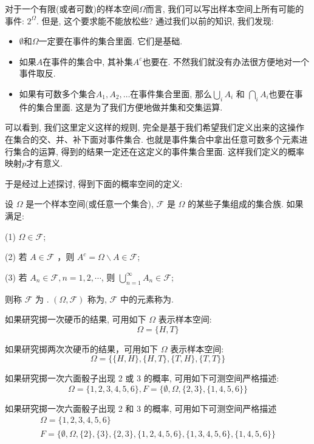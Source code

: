 \documentclass{ctexart}
\begin{document}
对于一个有限(或者可数)的样本空间$\Omega$而言, 我们可以写出样本空间上所有可能的事件: $2^\Omega$. 但是, 这个要求能不能放松些? 通过我们以前的知识, 我们发现: 
\begin{itemize}
    \item $\emptyset$和$\Omega$一定要在事件的集合里面. 它们是基础. 
    \item 如果$A$在事件的集合中, 其补集$A^c$也要在. 不然我们就没有办法很方便地对一个事件取反. 
    \item 如果有可数多个集合$A_1, A_2, \ldots$在事件集合里面, 那么$\bigcup_i A_i$ 和 $\bigcap_i A_i$也要在事件的集合里面. 这是为了我们方便地做并集和交集运算. 
\end{itemize} 

可以看到, 我们这里定义这样的规则, 完全是基于我们希望我们定义出来的这操作在集合的交、并、补下面对事件集合. 也就是事件集合中拿出任意可数多个元素进行集合的运算, 得到的结果一定还在这定义的事件集合里面. 这样我们定义的概率映射$p$才有意义. 

于是经过上述探讨, 得到下面的概率空间的定义: 

\begin{definition}
    设 $\Omega$ 是一个样本空间(或任意一个集合), $\mathcal{F}$ 是 $\Omega$ 的某些子集组成的集合族. 如果满足:

(1) $\Omega \in \mathcal{F}$;

(2) 若 $A \in \mathcal{F}$ ，则 $A^{c}=\Omega \backslash A \in \mathcal{F}$;

(3) 若 $A_{n} \in \mathcal{F}, n=1,2, \cdots$, 则 $\bigcup_{n=1}^{\infty} A_{n} \in \mathcal{F}$;

则称 $\mathcal{F}$ 为 . $(\Omega, \mathcal{F})$ 称为, $\mathcal{F}$ 中的元素称为.
\end{definition}

\begin{example}
    如果研究掷一次硬币的结果, 可用如下 $\Omega$ 表示样本空间:
$$
\Omega=\{H, T\}
$$

如果研究掷两次次硬币的结果，可用如下 $\Omega$ 表示样本空间:
$$
\Omega=\{\{H, H\},\{H, T\},\{T, H\},\{T, T\}\}
$$

如果研究掷一次六面骰子出现 2 或 3 的概率, 可用如下可测空间严格描述:
$$
\Omega=\{1,2,3,4,5,6\}, F=\{\emptyset, \Omega,\{2,3\},\{1,4,5,6\}\}
$$

如果研究掷一次六面骰子出现 2 和 3 的概率, 可用如下可测空间严格描述
$$
\begin{gathered}
\Omega=\{1,2,3,4,5,6\} \\
F=\{\emptyset, \Omega,\{2\},\{3\},\{2,3\},\{1,2,4,5,6\},\{1,3,4,5,6\},\{1,4,5,6\}\}
\end{gathered}
$$
\end{example}
\end{document}
